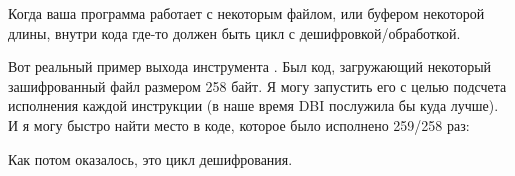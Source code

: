 
Когда ваша программа работает с некоторым файлом, или буфером некоторой длины,
внутри кода где-то должен быть цикл с дешифровкой/обработкой.

Вот реальный пример выхода инструмента \tracer.
Был код, загружающий некоторый зашифрованный файл размером 258 байт.
Я могу запустить его с целью подсчета исполнения каждой инструкции (в наше время \ac{DBI} послужила бы куда лучше).
И я могу быстро найти место в коде, которое было исполнено 259/258 раз:



Как потом оказалось, это цикл дешифрования.

